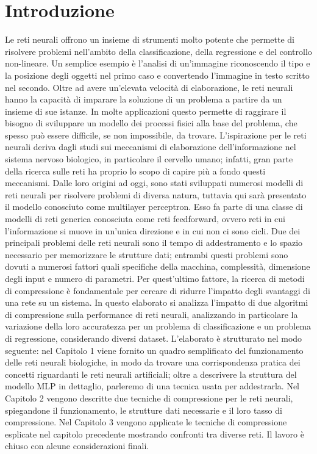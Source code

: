 \documentclass[11pt,a4paper,twoside,
openright]{book}
\begin{document}
\tableofcontents

\chapter*{Introduzione}
Le reti neurali offrono un insieme di strumenti molto potente che permette di risolvere problemi nell'ambito della classificazione, della regressione e del controllo non-lineare. Un semplice esempio è l'analisi di un'immagine riconoscendo il tipo e la posizione degli oggetti nel primo caso e convertendo l'immagine in testo scritto nel secondo.
Oltre ad avere un'elevata velocità di elaborazione, le reti neurali hanno la capacità di imparare la soluzione di un problema a partire da un insieme di sue istanze. In molte applicazioni questo permette di raggirare il bisogno di sviluppare un modello dei processi fisici alla base del problema, che spesso può essere difficile, se non impossibile, da trovare.
L'ispirazione per le reti neurali deriva dagli studi sui meccanismi di elaborazione dell'informazione nel sistema nervoso biologico, in particolare il cervello umano; infatti, gran parte della ricerca sulle reti ha proprio lo scopo di capire più a fondo questi meccanismi.
Dalle loro origini ad oggi, sono stati sviluppati numerosi modelli di reti neurali per risolvere problemi di diversa natura, tuttavia qui sarà presentato il modello conosciuto come multilayer perceptron. Esso fa parte di una classe di modelli di reti
generica conosciuta come reti feedforward, ovvero reti in cui l'informazione si muove in un'unica direzione e in cui non ci sono cicli.
Due dei principali problemi delle reti neurali sono il tempo di addestramento e lo spazio necessario per memorizzare le strutture dati; entrambi questi problemi sono dovuti a numerosi fattori  quali specifiche della macchina, complessità, dimensione degli input e numero di parametri. Per quest'ultimo fattore, la ricerca di metodi di compressione è fondamentale per cercare di ridurre l'impatto degli svantaggi di una rete su un sistema. 
In questo elaborato si analizza l'impatto di due algoritmi di compressione sulla performance di reti neurali, analizzando in particolare la variazione della loro accuratezza per un problema di classificazione e un problema di regressione, considerando diversi dataset.
L'elaborato è strutturato nel modo seguente: nel Capitolo 1 viene fornito un quadro semplificato del funzionamento delle reti neurali biologiche, in modo da trovare una corrispondenza pratica dei concetti riguardanti le reti neurali artificiali; oltre a descrivere la struttura del modello MLP in dettaglio, parleremo di una tecnica usata per addestrarla. Nel Capitolo 2 vengono descritte due tecniche di compressione per le reti neurali, spiegandone il funzionamento, le strutture dati necessarie e il loro tasso di compressione.
Nel Capitolo 3 vengono applicate le tecniche di compressione esplicate nel capitolo precedente mostrando confronti tra diverse reti. Il lavoro è chiuso con alcune considerazioni finali.
\end{document}
